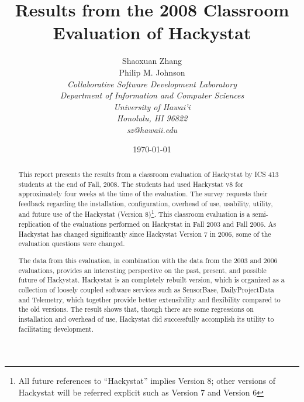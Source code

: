 \documentclass[11pt]{article}
\begin{document}
\title{Results from the 2008 Classroom Evaluation of Hackystat}

\author{Shaoxuan Zhang \\
				 Philip M. Johnson \\
\em  Collaborative Software Development Laboratory \\
\em  Department of Information and Computer Sciences \\
\em  University of Hawai'i \\
\em  Honolulu, HI 96822 \\
\em  sz@hawaii.edu \\
}

\date{\today}
\maketitle

\tableofcontents

\graphicspath{{figures/}} 

\newpage
\begin{abstract}
This report presents the results from a classroom evaluation of Hackystat by ICS 413 students at the end of Fall, 2008.  The students had used Hackystat v8 for approximately four weeks at the time of the evaluation.  The survey requests their feedback regarding the installation, configuration, overhead of use, usability, utility, and future use of the Hackystat (Version 8)\footnote{All future references to ``Hackystat'' implies Version 8; other versions of Hackystat will be referred explicit such as Version 7 and Version 6}. This classroom evaluation is a semi-replication of the evaluations performed on Hackystat in Fall 2003\cite{csdl2-03-13} and Fall 2006\cite{csdl2-07-02}. As Hackystat has changed significantly since Hackystat Version 7 in 2006, some of the evaluation questions were changed. 

The data from this evaluation, in combination with the data from the 2003 and 2006 evaluations, provides an interesting perspective on the past, present, and possible future of Hackystat. Hackystat is an completely rebuilt version, which is organized as a collection of loosely coupled software services such as SensorBase, DailyProjectData and Telemetry, which together provide better extensibility and flexibility compared to the old versions. The result shows that, though there are some regressions on installation and overhead of use, Hackystat did successfully accomplish its utility to facilitating development. 
\end{abstract}
\end{document}
